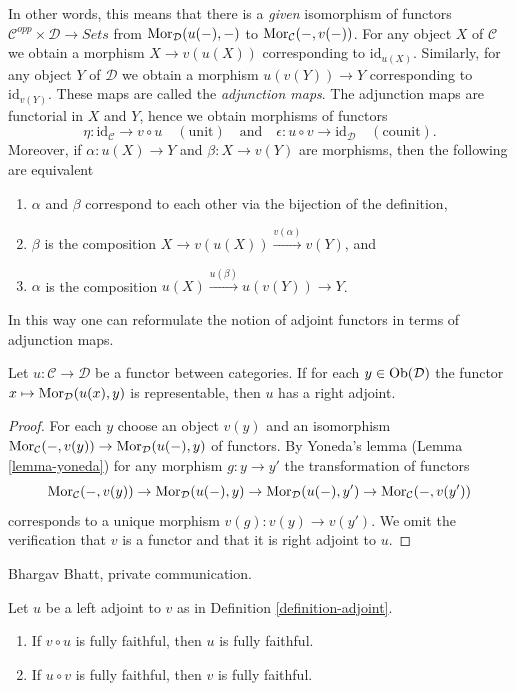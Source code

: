 \noindent
In other words, this means that there is a {\it given} isomorphism of functors
$\mathcal{C}^{opp} \times \mathcal{D} \to \textit{Sets}$ from
$\mathop{\mathrm{Mor}}\nolimits_\mathcal{D}(u(-), -)$ to $\mathop{\mathrm{Mor}}\nolimits_\mathcal{C}(-, v(-))$. For any object
$X$ of $\mathcal{C}$ we obtain a morphism $X \to v(u(X))$ corresponding to
$\text{id}_{u(X)}$. Similarly, for any object $Y$ of $\mathcal{D}$ we obtain
a morphism $u(v(Y)) \to Y$ corresponding to $\text{id}_{v(Y)}$.
These maps are called the {\it adjunction maps}. The adjunction maps
are functorial in $X$ and $Y$, hence we obtain morphisms of functors
$$
\eta : \text{id}_\mathcal{C} \to v \circ u\quad (\text{unit})
\quad\text{and}\quad
\epsilon : u \circ v \to \text{id}_\mathcal{D}\quad (\text{counit}).
$$
Moreover, if $\alpha : u(X) \to Y$
and $\beta : X \to v(Y)$ are morphisms, then the following are equivalent
\begin{enumerate}
\item $\alpha$ and $\beta$ correspond to each other via the
bijection of the definition,
\item $\beta$ is the composition $X \to v(u(X)) \xrightarrow{v(\alpha)} v(Y)$,
and
\item $\alpha$ is the composition $u(X) \xrightarrow{u(\beta)} u(v(Y)) \to Y$.
\end{enumerate}
In this way one can reformulate the notion of adjoint functors in terms
of adjunction maps.

\begin{lemma}
\label{lemma-adjoint-exists}
Let $u : \mathcal{C} \to \mathcal{D}$ be a functor between categories.
If for each $y \in \mathop{\mathrm{Ob}}\nolimits(\mathcal{D})$ the functor
$x \mapsto \mathop{\mathrm{Mor}}\nolimits_\mathcal{D}(u(x), y)$ is representable, then
$u$ has a right adjoint.
\end{lemma}

\begin{proof}
For each $y$ choose an object $v(y)$ and an isomorphism
$\mathop{\mathrm{Mor}}\nolimits_\mathcal{C}(-, v(y)) \to \mathop{\mathrm{Mor}}\nolimits_\mathcal{D}(u(-), y)$
of functors. By Yoneda's lemma (Lemma \ref{lemma-yoneda})
for any morphism $g : y \to y'$ the transformation of functors
$$
\mathop{\mathrm{Mor}}\nolimits_\mathcal{C}(-, v(y)) \to \mathop{\mathrm{Mor}}\nolimits_\mathcal{D}(u(-), y) \to
\mathop{\mathrm{Mor}}\nolimits_\mathcal{D}(u(-), y') \to \mathop{\mathrm{Mor}}\nolimits_\mathcal{C}(-, v(y'))
$$
corresponds to a unique morphism $v(g) : v(y) \to v(y')$.
We omit the verification that $v$ is a functor and that
it is right adjoint to $u$.
\end{proof}

\begin{lemma}
\label{lemma-left-adjoint-composed-fully-faithful}
\begin{reference}
Bhargav Bhatt, private communication.
\end{reference}
Let $u$ be a left adjoint to $v$ as in Definition \ref{definition-adjoint}.
\begin{enumerate}
\item If $v \circ u$ is fully faithful, then $u$ is fully faithful.
\item If $u \circ v$ is fully faithful, then $v$ is fully faithful.
\end{enumerate}
\end{lemma}

